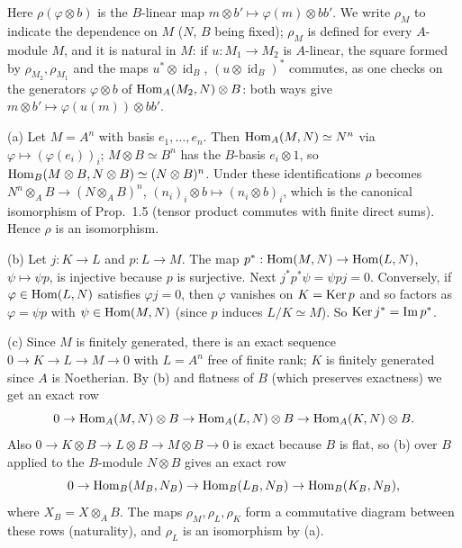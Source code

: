 \documentclass[11pt]{article}
\begin{document}
\pf
Here $\rho(\varphi\otimes b)$ is the $B$-linear map $m\otimes b'\mapsto\varphi(m)\otimes bb'$. We write $\rho_M$ to indicate the dependence on $M$ ($N$, $B$ being fixed); $\rho_M$ is defined for every $A$-module $M$, and it is natural in $M$: if $u:M_1\to M_2$ is $A$-linear, the square formed by $\rho_{M_2},\rho_{M_1}$ and the maps $u^*\otimes\operatorname{id}_B$, $(u\otimes\operatorname{id}_B)^*$ commutes, as one checks on the generators $\varphi\otimes b$ of $\operatorname{Hom}_A(M_2,N)\otimes B$: both ways give $m\otimes b'\mapsto\varphi(u(m))\otimes bb'$.

(a) Let $M=A^n$ with basis $e_1,\dots,e_n$. Then $\operatorname{Hom}_A(M,N)\simeq N^n$ via $\varphi\mapsto(\varphi(e_i))_i$; $M\otimes B\simeq B^n$ has the $B$-basis $e_i\otimes1$, so $\operatorname{Hom}_B(M\otimes B,N\otimes B)\simeq(N\otimes B)^n$. Under these identifications $\rho$ becomes $N^n\otimes_AB\to(N\otimes_AB)^n$, $(n_i)_i\otimes b\mapsto(n_i\otimes b)_i$, which is the canonical isomorphism of Prop.~1.5 (tensor product commutes with finite direct sums). Hence $\rho$ is an isomorphism.

(b) Let $j:K\to L$ and $p:L\to M$. The map $p^*:\operatorname{Hom}(M,N)\to\operatorname{Hom}(L,N)$, $\psi\mapsto\psi p$, is injective because $p$ is surjective. Next $j^*p^*\psi=\psi pj=0$. Conversely, if $\varphi\in\operatorname{Hom}(L,N)$ satisfies $\varphi j=0$, then $\varphi$ vanishes on $K=\operatorname{Ker} p$ and so factors as $\varphi=\psi p$ with $\psi\in\operatorname{Hom}(M,N)$ (since $p$ induces $L/K\simeq M$). So $\operatorname{Ker} j^*=\operatorname{Im} p^*$.

(c) Since $M$ is finitely generated, there is an exact sequence $0\to K\to L\to M\to0$ with $L=A^n$ free of finite rank; $K$ is finitely generated since $A$ is Noetherian. By (b) and flatness of $B$ (which preserves exactness) we get an exact row
\[ 0\to\operatorname{Hom}_A(M,N)\otimes B\to\operatorname{Hom}_A(L,N)\otimes B\to\operatorname{Hom}_A(K,N)\otimes B. \]
Also $0\to K\otimes B\to L\otimes B\to M\otimes B\to0$ is exact because $B$ is flat, so (b) over $B$ applied to the $B$-module $N\otimes B$ gives an exact row
\[ 0\to\operatorname{Hom}_B(M_B,N_B)\to\operatorname{Hom}_B(L_B,N_B)\to\operatorname{Hom}_B(K_B,N_B), \]
where $X_B=X\otimes_AB$. The maps $\rho_M,\rho_L,\rho_K$ form a commutative diagram between these rows (naturality), and $\rho_L$ is an isomorphism by (a).
\end{document}
